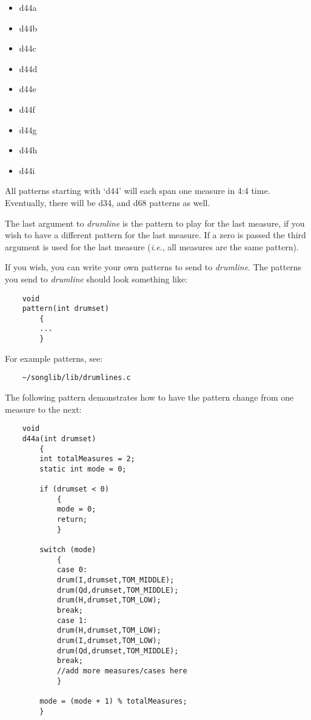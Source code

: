\documentclass{article}
\begin{document}
\begin{itemize}
\item d44a
\item d44b
\item d44c
\item d44d
\item d44e
\item d44f
\item d44g 
\item d44h 
\item d44i 
\end{itemize}

All patterns starting with `d44' will each span one measure in
4:4 time. Eventually, there will be d34, and d68 patterns as well.

The last argument to {\it drumline} is
the pattern to play for the last measure, if you
wish to have a different pattern for the last measure. If a zero is
passed the third argument is used for the last measure ({\it i.e}.,
all measures
are the same pattern).

If you wish, you can write your own patterns to send to {\it drumline}.
The patterns you send to {\it drumline} should look something like:

\begin{verbatim}
    void 
    pattern(int drumset)
        {
        ...
        }
\end{verbatim}

For example patterns, see:

\begin{verbatim}
    ~/songlib/lib/drumlines.c
\end{verbatim}

The following pattern demonstrates how to have the pattern change
from one measure to the next:

\begin{verbatim}
    void
    d44a(int drumset)
        {
        int totalMeasures = 2;
        static int mode = 0;

        if (drumset < 0)
            {
            mode = 0;
            return;
            }

        switch (mode)
            {
            case 0:
            drum(I,drumset,TOM_MIDDLE);
            drum(Qd,drumset,TOM_MIDDLE);
            drum(H,drumset,TOM_LOW);
            break;
            case 1:
            drum(H,drumset,TOM_LOW);
            drum(I,drumset,TOM_LOW);
            drum(Qd,drumset,TOM_MIDDLE);
            break;
            //add more measures/cases here
            }

        mode = (mode + 1) % totalMeasures;
        }
\end{verbatim}
\end{document}

